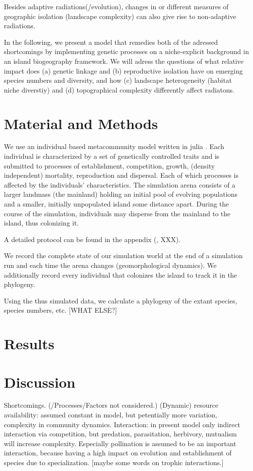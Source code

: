 \documentclass[a4paper]{scrartcl}
\begin{document}
Besides adaptive radiations(/evolution), changes in or different measures of geographic isolation (landscape complexity) can also give rise to non-adaptive radiations.

In the following, we present a model that remedies both of the adressed shortcomings by implementing genetic processes on a niche-explicit background
in an island biogeography framework.
We will adress the questions of what relative impact does (a) genetic linkage and (b) reproductive isolation have on emerging species numbers and diversity,
and how (c) landscape heterogeneity (habitat niche diverstiy) and (d) topographical complexity differently affect radiatons.





\section{Material and Methods}
We use an individual based metacommunity model written in julia \cite{JULIALANG}.
Each individual is characterized by a set of genetically controlled traits and is submitted to processes of
establishment, competition, growth, (density independent) mortality, reproduction and dispersal.
Each of which processes is affected by the individuals' characteristics.
The simulation arena consists of a larger landmass (the mainland) holding an initial pool of evolving populations and a smaller, initially unpopulated island some distance apart.
During the course of the simulation, individuals may disperse from the mainland to the island, thus colonizing it.

A detailed protocol can be found in the appendix (\cite{grimm2010odd}, XXX).

We record the complete state of our simulation world at the end of a simulation run and each time the arena changes (geomorphological dynamics).
We additionally record every individual that colonizes the island to track it in the phylogeny.

Using the thus simulated data, we calculate a phylogeny of the extant species, species numbers, etc. [WHAT ELSE?]
\section{Results}

\section{Discussion}
Shortcomings. (/Processes/Factors not considered.)
(Dynamic) resource availability: assumed constant in model, but petentially more variation, complexity in community dynamics.
Interaction: in present model only indirect interaction via competition, but predation, parasitation, herbivory, mutualism will increase complexity.
Especially pollination is assumed to be an important interaction, because having a high impact on evolution and establishment of species due to specialization.
[maybe some words on trophic interactions.]

\printbibliography
\end{document}

